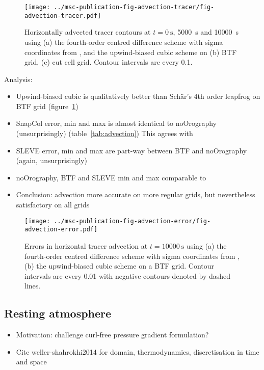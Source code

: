 \documentclass[twocol]{ametsoc}
\begin{document}
\begin{figure}
	\centering
	\texttt{[image: ../msc-publication-fig-advection-tracer/fig-advection-tracer.pdf]}
%
	\caption{Horizontally advected tracer contours at $t = \SI{0}{\second}$, \SI{5000}{\second} and \SI{10000}{\second} using (a) the fourth-order centred difference scheme with sigma coordinates from \citet{schaer2002}, and the upwind-biased cubic scheme on (b) BTF grid, (c) cut cell grid.  Contour intervals are every 0.1.}
	\label{fig:advection-tracer}
\end{figure}

Analysis:
\begin{itemize}
	\item Upwind-biased cubic is qualitatively better than Sch\"ar's 4th order leapfrog on BTF grid (figure~\ref{fig:advection-tracer})
	\item SnapCol error, min and max is almost identical to noOrography (unsurprisingly) (table~\ref{tab:advection})  This agrees with \citet{good2014}
	\item SLEVE error, min and max are part-way between BTF and noOrography (again, unsurprisingly)
	\item noOrography, BTF and SLEVE min and max comparable to \citet{schaer2002}
	\item Conclusion: advection more accurate on more regular grids, but nevertheless satisfactory on all grids
\end{itemize}


\begin{figure}
	\centering
	\texttt{[image: ../msc-publication-fig-advection-error/fig-advection-error.pdf]}
	\caption{Errors in horizontal tracer advection at $t = \SI{10000}{\second}$ using (a) the fourth-order centred difference scheme with sigma coordinates from \citet{schaer2002}, (b) the upwind-biased cubic scheme on a BTF grid.  Contour intervals are every 0.01 with negative contours denoted by dashed lines.}
	\label{fig:advection-error}
\end{figure}


\subsection{Resting atmosphere}

\begin{itemize}
	\item Motivation: challenge curl-free pressure gradient formulation?
	\item Cite weller-shahrokhi2014 for domain, thermodynamics, discretisation in time and space
\end{itemize}
\end{document}
